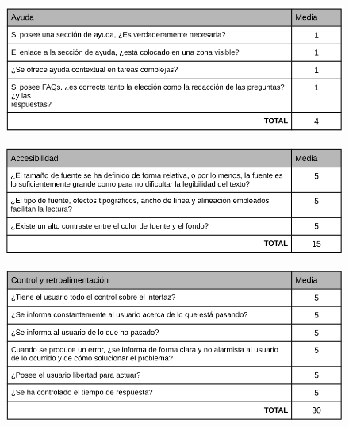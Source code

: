 \documentclass[pdftex,11pt,a4paper]{book}
\begin{document}
\begin{figure}[h]
\begin{center}
\includegraphics[width=\textwidth]{img/heuristico10}
\caption{\label{heuristico10}}
\end{center}
\end{figure}

\begin{figure}[h]
\begin{center}
\includegraphics[width=\textwidth]{img/heuristico11}
\caption{\label{heuristico11}}
\end{center}
\end{figure}

\begin{figure}[h]
\begin{center}
\includegraphics[width=\textwidth]{img/heuristico12}
\caption{\label{heuristico12}}
\end{center}
\end{figure}
\end{document}
